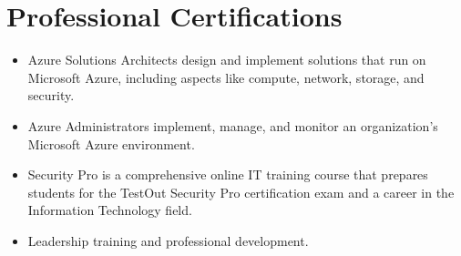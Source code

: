 \section{\color{black}Professional Certifications}
\resumeSubHeadingListStart
\color{blue}
\begin{itemize}
\color{black}\item Azure Solutions Architects design and implement solutions that run on Microsoft Azure, including aspects like compute, network, storage, and security.
\end{itemize}
\begin{itemize}
    \color{black}\item Azure Administrators implement, manage, and monitor an organization’s Microsoft Azure environment.
\end{itemize} 
\begin{itemize}
    \color{black}\item Security Pro is a comprehensive online IT training course that prepares students for the TestOut Security Pro certification exam and a career in the Information Technology field.
\end{itemize}
\begin{itemize}
    \color{black}\item Leadership training and professional development.
\end{itemize}
\resumeSubHeadingListEnd
